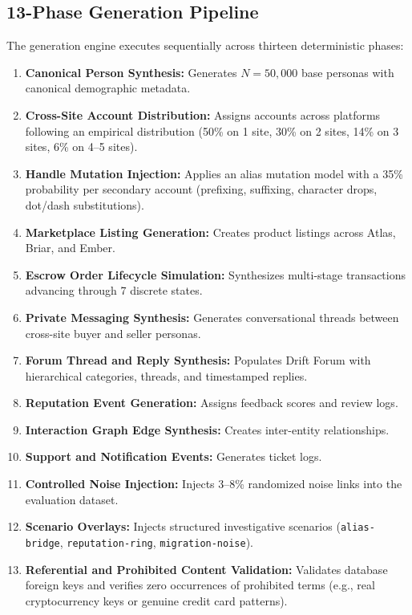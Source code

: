 \subsection{13-Phase Generation Pipeline}
The generation engine executes sequentially across thirteen deterministic phases:
\begin{enumerate}
    \item \textbf{Canonical Person Synthesis:} Generates $N = 50{,}000$ base personas with canonical demographic metadata.
    \item \textbf{Cross-Site Account Distribution:} Assigns accounts across platforms following an empirical distribution (50\% on 1 site, 30\% on 2 sites, 14\% on 3 sites, 6\% on 4--5 sites).
    \item \textbf{Handle Mutation Injection:} Applies an alias mutation model with a 35\% probability per secondary account (prefixing, suffixing, character drops, dot/dash substitutions).
    \item \textbf{Marketplace Listing Generation:} Creates product listings across Atlas, Briar, and Ember.
    \item \textbf{Escrow Order Lifecycle Simulation:} Synthesizes multi-stage transactions advancing through 7 discrete states.
    \item \textbf{Private Messaging Synthesis:} Generates conversational threads between cross-site buyer and seller personas.
    \item \textbf{Forum Thread and Reply Synthesis:} Populates Drift Forum with hierarchical categories, threads, and timestamped replies.
    \item \textbf{Reputation Event Generation:} Assigns feedback scores and review logs.
    \item \textbf{Interaction Graph Edge Synthesis:} Creates inter-entity relationships.
    \item \textbf{Support and Notification Events:} Generates ticket logs.
    \item \textbf{Controlled Noise Injection:} Injects 3--8\% randomized noise links into the evaluation dataset.
    \item \textbf{Scenario Overlays:} Injects structured investigative scenarios (\texttt{alias-bridge}, \texttt{reputation-ring}, \texttt{migration-noise}).
    \item \textbf{Referential and Prohibited Content Validation:} Validates database foreign keys and verifies zero occurrences of prohibited terms (e.g., real cryptocurrency keys or genuine credit card patterns).
\end{enumerate}

